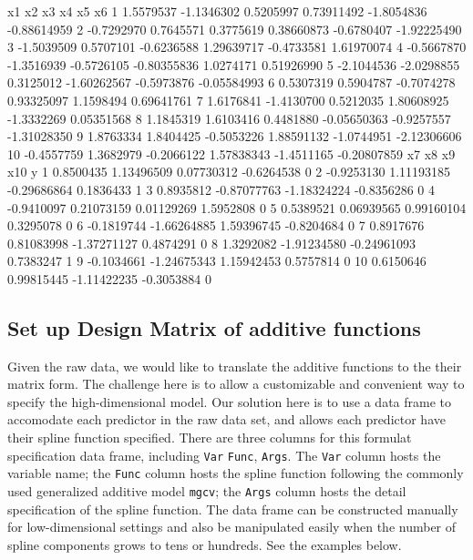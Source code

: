 \documentclass[
]{jss}
\begin{document}
\begin{CodeChunk}
\begin{CodeOutput}
           x1         x2         x3          x4         x5          x6
1   1.5579537 -1.1346302  0.5205997  0.73911492 -1.8054836 -0.88614959
2  -0.7292970  0.7645571  0.3775619  0.38660873 -0.6780407 -1.92225490
3  -1.5039509  0.5707101 -0.6236588  1.29639717 -0.4733581  1.61970074
4  -0.5667870 -1.3516939 -0.5726105 -0.80355836  1.0274171  0.51926990
5  -2.1044536 -2.0298855  0.3125012 -1.60262567 -0.5973876 -0.05584993
6   0.5307319  0.5904787 -0.7074278  0.93325097  1.1598494  0.69641761
7   1.6176841 -1.4130700  0.5212035  1.80608925 -1.3332269  0.05351568
8   1.1845319  1.6103416  0.4481880 -0.05650363 -0.9257557 -1.31028350
9   1.8763334  1.8404425 -0.5053226  1.88591132 -1.0744951 -2.12306606
10 -0.4557759  1.3682979 -0.2066122  1.57838343 -1.4511165 -0.20807859
           x7          x8          x9        x10 y
1   0.8500435  1.13496509  0.07730312 -0.6264538 0
2  -0.9253130  1.11193185 -0.29686864  0.1836433 1
3   0.8935812 -0.87077763 -1.18324224 -0.8356286 0
4  -0.9410097  0.21073159  0.01129269  1.5952808 0
5   0.5389521  0.06939565  0.99160104  0.3295078 0
6  -0.1819744 -1.66264885  1.59396745 -0.8204684 0
7   0.8917676  0.81083998 -1.37271127  0.4874291 0
8   1.3292082 -1.91234580 -0.24961093  0.7383247 1
9  -0.1034661 -1.24675343  1.15942453  0.5757814 0
10  0.6150646  0.99815445 -1.11422235 -0.3053884 0
\end{CodeOutput}
\end{CodeChunk}

\subsection{Set up Design Matrix of additive functions}

Given the raw data, we would like to translate the additive functions to
the their matrix form. The challenge here is to allow a customizable and
convenient way to specify the high-dimensional model. Our solution here
is to use a data frame to accomodate each predictor in the raw data set,
and allows each predictor have their spline function specified. There
are three columns for this formulat specification data frame, including
\texttt{Var} \texttt{Func}, \texttt{Args}. The \texttt{Var} column hosts
the variable name; the \texttt{Func} column hosts the spline function
following the commonly used generalized additive model \texttt{mgcv};
the \texttt{Args} column hosts the detail specification of the spline
function. The data frame can be constructed manually for low-dimensional
settings and also be manipulated easily when the number of spline
components grows to tens or hundreds. See the examples below.
\end{document}
